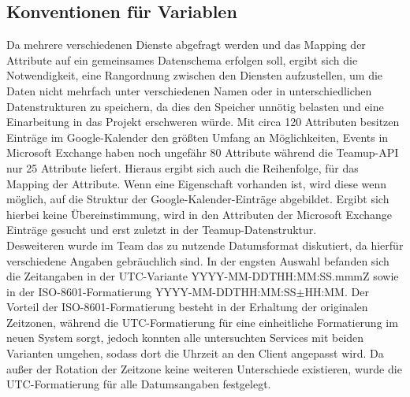 \subsection{Konventionen für Variablen}
Da mehrere verschiedenen Dienste abgefragt werden und das Mapping der Attribute auf ein gemeinsames Datenschema erfolgen soll, ergibt sich die Notwendigkeit, eine Rangordnung zwischen den Diensten aufzustellen, um die Daten nicht mehrfach unter verschiedenen Namen oder in unterschiedlichen Datenstrukturen zu speichern, da dies den Speicher unnötig belasten und eine Einarbeitung in das Projekt erschweren würde. Mit circa 120 Attributen besitzen Einträge im Google-Kalender den größten Umfang an Möglichkeiten, Events in Microsoft Exchange haben noch ungefähr 80 Attribute während die Teamup-API nur 25 Attribute liefert. Hieraus ergibt sich auch die Reihenfolge, für das Mapping der Attribute. Wenn eine Eigenschaft vorhanden ist, wird diese wenn möglich, auf die Struktur der Google-Kalender-Einträge abgebildet. Ergibt sich hierbei keine Übereinstimmung, wird in den Attributen der Microsoft Exchange Einträge gesucht und erst zuletzt in der Teamup-Datenstruktur. \\
Desweiteren wurde im Team das zu nutzende Datumsformat diskutiert, da hierfür verschiedene Angaben gebräuchlich sind. In der engsten Auswahl befanden sich die Zeitangaben in der UTC-Variante \glqq YYYY-MM-DDTHH:MM:SS.mmmZ\grqq{} sowie in der ISO-8601-Formatierung \glqq YYYY-MM-DDTHH:MM:SS$\pm$HH:MM\grqq. Der Vorteil der ISO-8601-Formatierung besteht in der Erhaltung der originalen Zeitzonen, während die UTC-Formatierung für eine einheitliche Formatierung im neuen System sorgt, jedoch konnten alle untersuchten Services mit beiden Varianten umgehen, sodass dort die Uhrzeit an den Client angepasst wird. Da außer der Rotation der Zeitzone keine weiteren Unterschiede existieren, wurde die UTC-Formatierung für alle Datumsangaben festgelegt.


